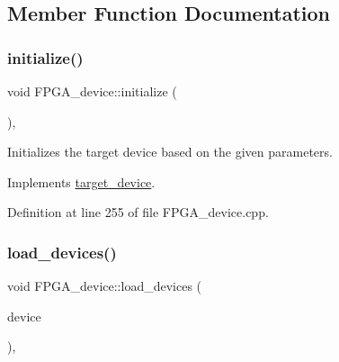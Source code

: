 \subsection{Member Function Documentation}
\mbox{\label{classFPGA__device_a67c74984f6a780600c6e4858687c7298}} 
\subsubsection{\texorpdfstring{initialize()}{initialize()}}
{\footnotesize\ttfamily void F\+P\+G\+A\+\_\+device\+::initialize (\begin{DoxyParamCaption}{ }\end{DoxyParamCaption})\hspace{0.3cm}{\ttfamily [override]}, {\ttfamily [virtual]}}



Initializes the target device based on the given parameters. 



Implements \hyperlink{classtarget__device_a8036fcb32879f6d3acd5b3f71a457a3e}{target\+\_\+device}.



Definition at line 255 of file F\+P\+G\+A\+\_\+device.\+cpp.

\mbox{\label{classFPGA__device_aabe12325194fdd8b0f03ed674f64419b}} 
\subsubsection{\texorpdfstring{load\+\_\+devices()}{load\_devices()}}
{\footnotesize\ttfamily void F\+P\+G\+A\+\_\+device\+::load\+\_\+devices (\begin{DoxyParamCaption}\item[{const \hyperlink{target__device_8hpp_acedb2b7a617e27e6354a8049fee44eda}{target\+\_\+device\+Ref}}]{device }\end{DoxyParamCaption})\hspace{0.3cm}{\ttfamily [override]}, {\ttfamily [virtual]}}



